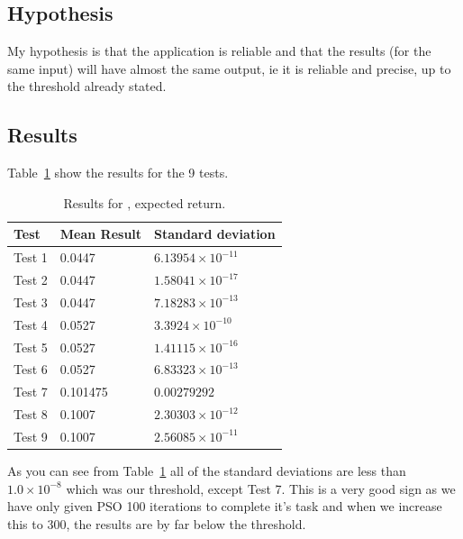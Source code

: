 \documentclass{pdfmx4020}
\begin{document}
    \subsection{Hypothesis} %
    \label{sub:hypothesis}
      My hypothesis is that the application is reliable and that the results (for the same input) will have almost the same output, ie it is reliable and precise, up to the threshold already stated. 

    \subsection{Results} %
    \label{sub:results}
      Table~\ref{table:expected_results} show the results for the 9 tests.
        \begin{table}[H]
          \setlength{\extrarowheight}{2.0pt}
          \begin{tabular}{|l|l|l|}
            \hline
            Test & Mean Result & Standard deviation \\
            \hline
            Test 1 & 0.0447 & $6.13954\times10^{-11}$ \\
            \hline
            Test 2 & 0.0447 & $1.58041\times10^{-17}$ \\
            \hline
            Test 3 & 0.0447 & $7.18283\times10^{-13}$ \\
            \hline
            Test 4 & 0.0527 & $3.3924\times10^{-10}$ \\
            \hline
            Test 5 & 0.0527 & $1.41115\times10^{-16}$ \\
            \hline
            Test 6 & 0.0527 & $6.83323\times10^{-13}$ \\
            \hline
            Test 7 & 0.101475 & $0.00279292$ \\
            \hline
            Test 8 & 0.1007 & $2.30303\times10^{-12}$ \\
            \hline
            Test 9 & 0.1007 & $2.56085\times10^{-11}$ \\
            \hline
          \end{tabular}
          \caption{Results for , expected return.}
          \label{table:expected_results}
        \end{table}
      As you can see from Table~\ref{table:expected_results} all of the standard deviations are less than $1.0\times10^{-8}$ which was our threshold, except Test 7. This is a very good sign as we have only given PSO 100 iterations to complete it's task and when we increase this to 300, the results are by far below the threshold. 
\end{document}

